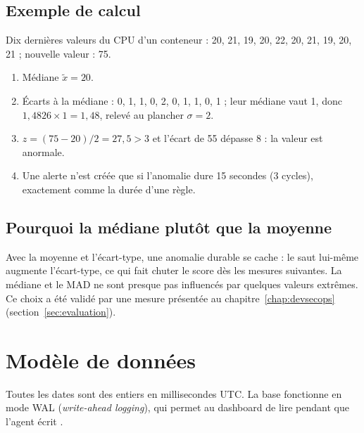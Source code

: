 \subsection{Exemple de calcul}

Dix dernières valeurs du CPU d'un conteneur : 20, 21, 19, 20, 22, 20, 21, 19, 20, 21 ; nouvelle
valeur : 75.
\begin{enumerate}
  \item Médiane $\tilde{x} = 20$.
  \item Écarts à la médiane : 0, 1, 1, 0, 2, 0, 1, 1, 0, 1 ; leur médiane vaut 1, donc
        $1{,}4826 \times 1 = 1{,}48$, relevé au plancher $\sigma = 2$.
  \item $z = (75 - 20) / 2 = 27{,}5 > 3$ et l'écart de 55 dépasse 8 : la valeur est anormale.
  \item Une alerte n'est créée que si l'anomalie dure 15 secondes (3 cycles), exactement comme
        la durée  d'une règle.
\end{enumerate}

\subsection{Pourquoi la médiane plutôt que la moyenne}

Avec la moyenne et l'écart-type, une anomalie durable \og se cache \fg{} : le saut lui-même
augmente l'écart-type, ce qui fait chuter le score dès les mesures suivantes. La médiane et le
MAD ne sont presque pas influencés par quelques valeurs extrêmes. Ce choix a été validé par une
mesure présentée au chapitre~\ref{chap:devsecops} (section~\ref{sec:evaluation}).

\section{Modèle de données}


Toutes les dates sont des entiers en millisecondes UTC. La base fonctionne en mode WAL
(\emph{write-ahead logging}), qui permet au dashboard de lire pendant que l'agent écrit
\cite{sqlite-wal}.


